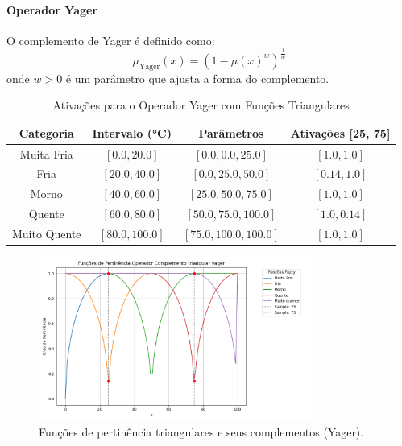\documentclass[a4paper,12pt]{article}
\begin{document}
\paragraph{Operador Yager}

O complemento de Yager é definido como:
\[
\mu_{\text{Yager}}(x) = \left(1 - \mu(x)^w\right)^{\frac{1}{w}}
\]
onde $w > 0$ é um parâmetro que ajusta a forma do complemento.

\begin{table}[H]
\centering
\caption{Ativações para o Operador Yager com Funções Triangulares}
\begin{tabular}{|c|c|c|c|}
\hline
\textbf{Categoria}    & \textbf{Intervalo (°C)} & \textbf{Parâmetros}       & \textbf{Ativações [25, 75]} \\ \hline
Muita Fria            & $[0.0, 20.0]$          & $[0.0, 0.0, 25.0]$        & $[1.0, 1.0]$               \\ \hline
Fria                  & $[20.0, 40.0]$         & $[0.0, 25.0, 50.0]$       & $[0.14, 1.0]$              \\ \hline
Morno                 & $[40.0, 60.0]$         & $[25.0, 50.0, 75.0]$      & $[1.0, 1.0]$               \\ \hline
Quente                & $[60.0, 80.0]$         & $[50.0, 75.0, 100.0]$     & $[1.0, 0.14]$              \\ \hline
Muito Quente          & $[80.0, 100.0]$        & $[75.0, 100.0, 100.0]$    & $[1.0, 1.0]$               \\ \hline
\end{tabular}
\end{table}

\begin{figure}[H]
    \centering
    \includegraphics[width=0.8\textwidth]{img/funções_de_pertinência_operador_complemento_triangular_yager_fuzzificado.png}
    \caption{Funções de pertinência triangulares e seus complementos (Yager).}
    \label{fig:complemento_yager_triangular}
\end{figure}
\end{document}
